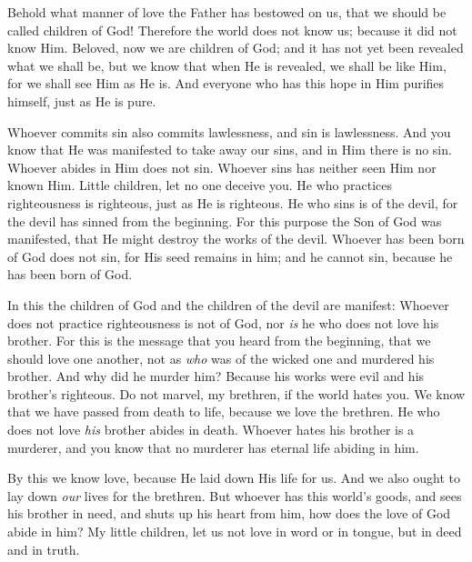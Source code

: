 
\bverse Behold what manner of love the Father has bestowed on us, that we should be called children of God! Therefore the world does not know us; because it did not know Him.
\bverse Beloved, now we are children of God; and it has not yet been revealed what we shall be, but we know that when He is revealed, we shall be like Him, for we shall see Him as He is.
\bverse And everyone who has this hope in Him purifies himself, just as He is pure.


\bverse Whoever commits sin also commits lawlessness, and sin is lawlessness.
\bverse And you know that He was manifested to take away our sins, and in Him there is no sin.
\bverse Whoever abides in Him does not sin. Whoever sins has neither seen Him nor known Him.
\bverse Little children, let no one deceive you. He who practices righteousness is righteous, just as He is righteous.
\bverse He who sins is of the devil, for the devil has sinned from the beginning. For this purpose the Son of God was manifested, that He might destroy the works of the devil.
\bverse Whoever has been born of God does not sin, for His seed remains in him; and he cannot sin, because he has been born of God.


\bverse In this the children of God and the children of the devil are manifest: Whoever does not practice righteousness is not of God, nor \textit{is} he who does not love his brother.
\bverse For this is the message that you heard from the beginning, that we should love one another,
\bverse not as \Cain \textit{who} was of the wicked one and murdered his brother. And why did he murder him? Because his works were evil and his brother's righteous.
\bverse Do not marvel, my brethren, if the world hates you.
\bverse We know that we have passed from death to life, because we love the brethren. He who does not love \textit{his} brother abides in death.
\bverse Whoever hates his brother is a murderer, and you know that no murderer has eternal life abiding in him.


\bverse By this we know love, because He laid down His life for us. And we also ought to lay down \textit{our} lives for the brethren.
\bverse But whoever has this world's goods, and sees his brother in need, and shuts up his heart from him, how does the love of God abide in him?
\bverse My little children, let us not love in word or in tongue, but in deed and in truth.

